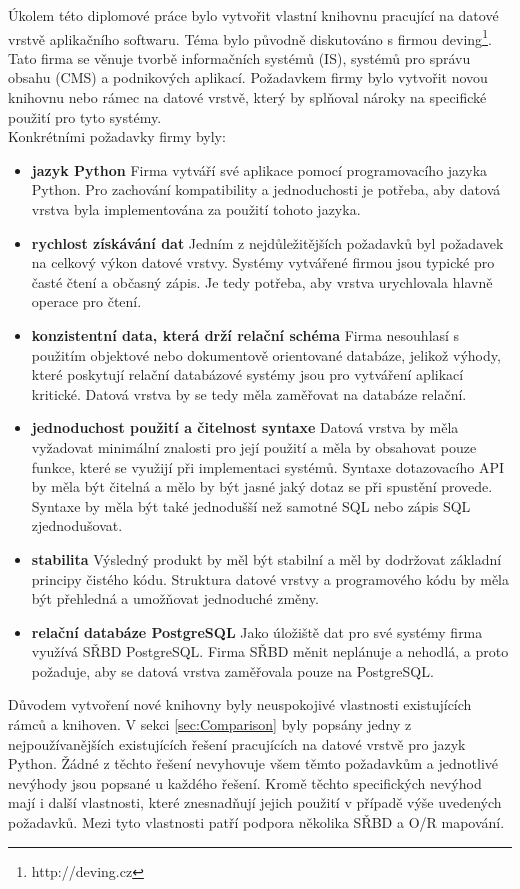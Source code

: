 \documentclass[ing,male,java,dept456]{diploma}						%
\begin{document}
Úkolem této diplomové práce bylo vytvořit vlastní knihovnu pracující na datové vrstvě aplikačního softwaru. Téma bylo původně diskutováno s firmou deving\footnote{http://deving.cz}. Tato firma se věnuje tvorbě informačních systémů (IS), systémů pro správu obsahu (CMS) a podnikových aplikací. Požadavkem firmy bylo vytvořit novou knihovnu nebo rámec na datové vrstvě, který by splňoval nároky na specifické použití pro tyto systémy. \\
Konkrétními požadavky firmy byly:
\begin{itemize}
\item \textbf{jazyk Python} Firma vytváří své aplikace pomocí programovacího jazyka Python. Pro zachování kompatibility a jednoduchosti je potřeba, aby datová vrstva byla implementována za použití tohoto jazyka.
\item \textbf{rychlost získávání dat} Jedním z nejdůležitějších požadavků byl požadavek na celkový výkon datové vrstvy. Systémy vytvářené firmou jsou typické pro časté čtení a občasný zápis. Je tedy potřeba, aby vrstva urychlovala hlavně operace pro čtení. 
\item \textbf{konzistentní data, která drží relační schéma} Firma nesouhlasí s použitím objektové nebo dokumentově orientované databáze, jelikož výhody, které poskytují relační databázové systémy jsou pro vytváření aplikací kritické. Datová vrstva by se tedy měla zaměřovat na databáze relační.
\item \textbf{jednoduchost použití a čitelnost syntaxe} Datová vrstva by měla vyžadovat minimální znalosti pro její použití a měla by obsahovat pouze funkce, které se využijí při implementaci systémů. Syntaxe dotazovacího API by měla být čitelná a mělo by být jasné jaký dotaz se při spustění provede. Syntaxe by měla být také jednodušší než samotné SQL nebo zápis SQL zjednodušovat.
\item \textbf{stabilita} Výsledný produkt by měl být stabilní a měl by dodržovat základní principy čistého kódu. Struktura datové vrstvy a programového kódu by měla být přehledná a umožňovat jednoduché změny.
\item \textbf{relační databáze PostgreSQL} Jako úložiště dat pro své systémy firma využívá SŘBD PostgreSQL. Firma SŘBD měnit neplánuje a nehodlá, a proto požaduje, aby se datová vrstva zaměřovala pouze na PostgreSQL.
\end{itemize}

Důvodem vytvoření nové knihovny byly neuspokojivé vlastnosti existujících rámců a knihoven. V sekci \ref{sec:Comparison} byly popsány jedny z nejpoužívanějších existujících řešení pracujících na datové vrstvě pro jazyk Python. Žádné z těchto řešení nevyhovuje všem těmto požadavkům a jednotlivé nevýhody jsou popsané u každého řešení. Kromě těchto specifických nevýhod mají i další vlastnosti, které znesnadňují jejich použití v případě výše uvedených požadavků. Mezi tyto vlastnosti patří podpora několika SŘBD a O/R mapování. 
\end{document}
